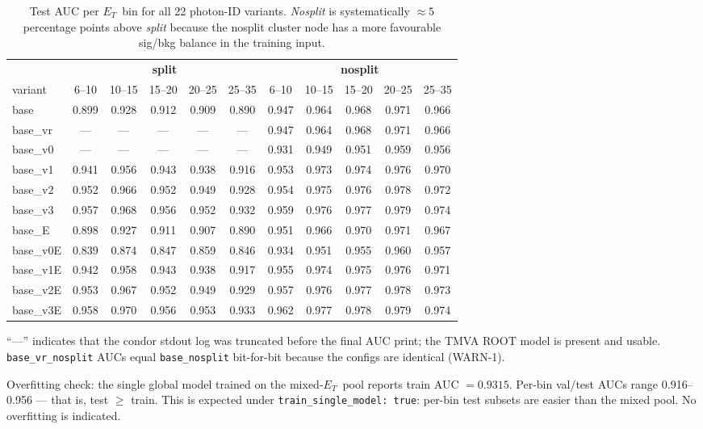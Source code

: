 \documentclass[11pt,a4paper]{article}
\newcommand{\etg}{$E_T$}
\begin{document}
\begin{table}[H]
\centering
\caption{Test AUC per \etg\ bin for all 22 photon-ID variants.
\emph{Nosplit} is systematically $\approx 5$ percentage points above
\emph{split} because the nosplit cluster node has a more favourable
sig/bkg balance in the training input.}
\begin{tabular}{l|ccccc|ccccc}
\toprule
 & \multicolumn{5}{c|}{\textbf{split}} & \multicolumn{5}{c}{\textbf{nosplit}} \\
variant & 6--10 & 10--15 & 15--20 & 20--25 & 25--35 & 6--10 & 10--15 & 15--20 & 20--25 & 25--35 \\
\midrule
base    & 0.899 & 0.928 & 0.912 & 0.909 & 0.890 & 0.947 & 0.964 & 0.968 & 0.971 & 0.966 \\
base\_vr  & ---   & ---   & ---   & ---   & ---   & 0.947 & 0.964 & 0.968 & 0.971 & 0.966 \\
base\_v0  & ---   & ---   & ---   & ---   & ---   & 0.931 & 0.949 & 0.951 & 0.959 & 0.956 \\
base\_v1  & 0.941 & 0.956 & 0.943 & 0.938 & 0.916 & 0.953 & 0.973 & 0.974 & 0.976 & 0.970 \\
base\_v2  & 0.952 & 0.966 & 0.952 & 0.949 & 0.928 & 0.954 & 0.975 & 0.976 & 0.978 & 0.972 \\
base\_v3  & 0.957 & 0.968 & 0.956 & 0.952 & 0.932 & 0.959 & 0.976 & 0.977 & 0.979 & 0.974 \\
base\_E   & 0.898 & 0.927 & 0.911 & 0.907 & 0.890 & 0.951 & 0.966 & 0.970 & 0.971 & 0.967 \\
base\_v0E & 0.839 & 0.874 & 0.847 & 0.859 & 0.846 & 0.934 & 0.951 & 0.955 & 0.960 & 0.957 \\
base\_v1E & 0.942 & 0.958 & 0.943 & 0.938 & 0.917 & 0.955 & 0.974 & 0.975 & 0.976 & 0.971 \\
base\_v2E & 0.953 & 0.967 & 0.952 & 0.949 & 0.929 & 0.957 & 0.976 & 0.977 & 0.978 & 0.973 \\
base\_v3E & 0.958 & 0.970 & 0.956 & 0.953 & 0.933 & 0.962 & 0.977 & 0.978 & 0.979 & 0.974 \\
\bottomrule
\end{tabular}
\label{tab:auc}
\end{table}

``---'' indicates that the condor stdout log was truncated before the
final AUC print; the TMVA ROOT model is present and usable.
\texttt{base\_vr\_nosplit} AUCs equal \texttt{base\_nosplit} bit-for-bit
because the configs are identical (WARN-1).

Overfitting check: the single global model trained on the mixed-\etg\
pool reports train AUC $=0.9315$. Per-bin val/test AUCs range 0.916--0.956
--- that is, test $\geq$ train. This is expected under
\texttt{train\_single\_model: true}: per-bin test subsets are easier
than the mixed pool. No overfitting is indicated.
\end{document}
